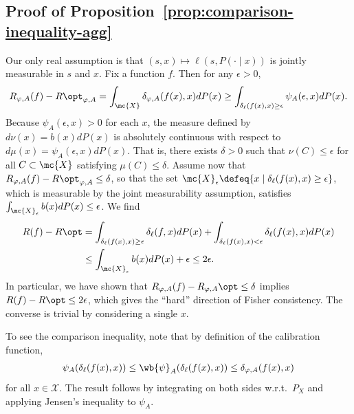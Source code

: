 \documentclass[11pt]{article}
\newcommand{\dstr}{P}
\newcommand{\sX}{\mathcal{X}} %
\newcommand{\tloss}{\ell}  %
\newcommand{\sloss}{\varphi}  %
\newcommand{\extloss}{\delta_\tloss}
\newcommand{\exslossagg}{\delta_{\sloss,A}}
\begin{document}
\subsection{Proof of Proposition~\ref{prop:comparison-inequality-agg}}
\label{sec:proof-comparison-inequality-agg}

Our only real assumption is that
$(s, x) \mapsto \tloss(s, P(\cdot \mid x))$ is jointly measurable
in $s$ and $x$.
%
Fix a function $f$.
%
Then for any $\epsilon > 0$,
\begin{align*}
  R_{\sloss,A}(f) - R\opt_{\sloss,A}
  = \int_{\mc{X}} \exslossagg(f(x), x) dP(x)
  \ge \int_{\extloss(f(x), x) \ge \epsilon} \psi_A(\epsilon, x) dP(x).
\end{align*}
Because $\psi_A(\epsilon, x) > 0$ for each $x$, the
measure defined by $d\nu(x) = b(x) dP(x)$ is
absolutely continuous with respect to
$d\mu(x) = \psi_A(\epsilon, x) dP(x)$.
%
That is, there exists $\delta > 0$ such that
$\nu(C) \le \epsilon$ for all $C \subset \mc{X}$
satisfying $\mu(C) \le \delta$.
%
Assume now that $R_{\sloss,A}(f) - R\opt_{\sloss,A} \le \delta$, so that
the set $\mc{X}_\epsilon \defeq \{x \mid \extloss(f(x), x) \ge \epsilon\}$,
which is measurable by the joint measurability assumption, satisfies
$\int_{\mc{X}_\epsilon} b(x) dP(x) \le \epsilon$.
%
We find
\begin{align*}
  R(f) - R\opt
  & = \int_{\extloss(f(x), x) \ge \epsilon}
  \extloss(f, x) dP(x)
  + \int_{\extloss(f(x), x) < \epsilon} \extloss(f(x), x) dP(x) \\
  & \le \int_{\mc{X}_\epsilon} b(x) dP(x)
  + \epsilon \le 2 \epsilon.
\end{align*}
In particular, we have shown that
$R_{\sloss,A}(f) - R_{\sloss,A}\opt \le \delta$
implies $R(f) - R\opt \le 2 \epsilon$,
which gives the ``hard'' direction of Fisher consistency.
%
The converse is trivial by considering a single $x$.

To see the comparison inequality,
note that by
definition of the calibration function,
\begin{align*}
  \psi_A(\extloss(f(x), x)) \leq \wb{\psi}_A(\extloss(f(x), x))
  \leq \exslossagg(f(x), x)
\end{align*}
for all $x \in \sX$.
%
The result follows by integrating on both sides w.r.t.\ $\dstr_X$ and
applying Jensen's inequality to $\psi_A$.



\end{document}
